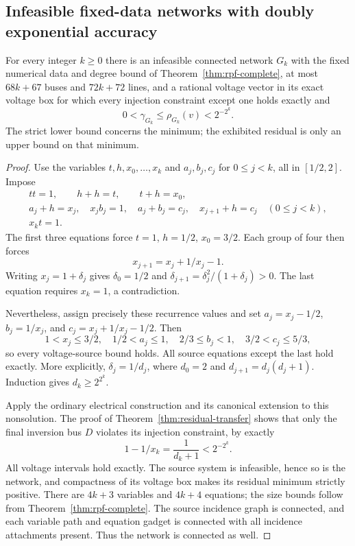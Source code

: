 \subsection{Infeasible fixed-data networks with doubly exponential accuracy}

\begin{theorem}
\label{thm:tiny-residual}
For every integer $k\ge0$ there is an infeasible connected network $G_k$
with the fixed numerical data and degree bound of
Theorem~\ref{thm:rpf-complete}, at most $68k+67$ buses and $72k+72$
lines, and a rational voltage vector in its exact voltage box for which
every injection constraint except one holds exactly and
\begin{equation}
 0<\gamma_{G_k}\le\rho_{G_k}(v)<2^{-2^k}.
 \label{eq:tiny-residual}
\end{equation}
The strict lower bound concerns the minimum; the exhibited residual is only
an upper bound on that minimum.
\end{theorem}
\begin{proof}
Use the variables $t,h,x_0,\ldots,x_k$ and
$a_j,b_j,c_j$ for $0\le j<k$, all in $[1/2,2]$. Impose
\begin{equation}
\begin{gathered}
 tt=1,\qquad h+h=t,\qquad t+h=x_0,\\
 a_j+h=x_j,\quad x_jb_j=1,\quad a_j+b_j=c_j,\quad x_{j+1}+h=c_j
                 \quad(0\le j<k),\\
 x_kt=1.
\end{gathered}
 \label{eq:tiny-system}
\end{equation}
The first three equations force $t=1$, $h=1/2$, $x_0=3/2$.
Each group of four then forces
\[
 x_{j+1}=x_j+1/x_j-1.
\]
Writing $x_j=1+\delta_j$ gives
$\delta_0=1/2$ and
$\delta_{j+1}=\delta_j^2/(1+\delta_j)>0$.
The last equation requires $x_k=1$, a contradiction.

Nevertheless, assign precisely these recurrence values and set
$a_j=x_j-1/2$, $b_j=1/x_j$, and $c_j=x_j+1/x_j-1/2$.
Then
\[
 1<x_j\le3/2,\quad 1/2<a_j\le1,\quad
 2/3\le b_j<1,\quad 3/2<c_j\le5/3,
\]
so every voltage-source bound holds. All source equations except the last
hold exactly. More explicitly, $\delta_j=1/d_j$, where
$d_0=2$ and $d_{j+1}=d_j(d_j+1)$. Induction gives
$d_k\ge2^{2^k}$.

Apply the ordinary electrical construction and its canonical extension to
this nonsolution. The proof of Theorem~\ref{thm:residual-transfer} shows
that only the final inversion bus $D$ violates its injection constraint,
by exactly
\[
 1-1/x_k=\frac{1}{d_k+1}<2^{-2^k}.
\]
All voltage intervals hold exactly. The source system is infeasible, hence
so is the network, and compactness of its voltage box makes its residual
minimum strictly positive. There are $4k+3$ variables and $4k+4$ equations;
the size bounds follow from Theorem~\ref{thm:rpf-complete}.
The source incidence graph is connected, and each variable path and equation
gadget is connected with all incidence attachments present. Thus the network
is connected as well.
\end{proof}

